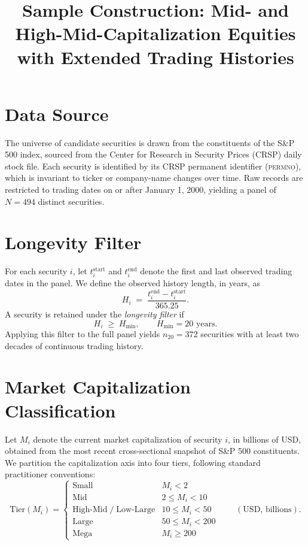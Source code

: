 \documentclass[11pt]{article}
\title{Sample Construction: Mid- and High-Mid-Capitalization Equities\\
with Extended Trading Histories}
\author{}
\date{}
\begin{document}
\maketitle

\section{Data Source}

The universe of candidate securities is drawn from the constituents of the
S\&P 500 index, sourced from the Center for Research in Security Prices
(CRSP) daily stock file. Each security is identified by its CRSP permanent
identifier (\textsc{permno}), which is invariant to ticker or company-name
changes over time. Raw records are restricted to trading dates on or after
January 1, 2000, yielding a panel of $N = 494$ distinct securities.

\section{Longevity Filter}

For each security $i$, let $t_i^{\text{start}}$ and $t_i^{\text{end}}$
denote the first and last observed trading dates in the panel. We define
the observed history length, in years, as
\begin{equation}
  H_i \;=\; \frac{t_i^{\text{end}} - t_i^{\text{start}}}{365.25}.
\end{equation}
A security is retained under the \emph{longevity filter} if
\begin{equation}
  H_i \;\geq\; H_{\min}, \qquad H_{\min} = 20 \text{ years}.
\end{equation}
Applying this filter to the full panel yields $n_{20} = 372$ securities
with at least two decades of continuous trading history.

\section{Market Capitalization Classification}

Let $M_i$ denote the current market capitalization of security $i$, in
billions of USD, obtained from the most recent cross-sectional snapshot of
S\&P 500 constituents. We partition the capitalization axis into four
tiers, following standard practitioner conventions:
\begin{equation}
  \text{Tier}(M_i) =
  \begin{cases}
    \text{Small}     & M_i < 2 \\
    \text{Mid}        & 2 \leq M_i < 10 \\
    \text{High-Mid} \; / \; \text{Low-Large} & 10 \leq M_i < 50 \\
    \text{Large}      & 50 \leq M_i < 200 \\
    \text{Mega}       & M_i \geq 200
  \end{cases}
  \qquad (\text{USD, billions}).
\end{equation}
\end{document}
